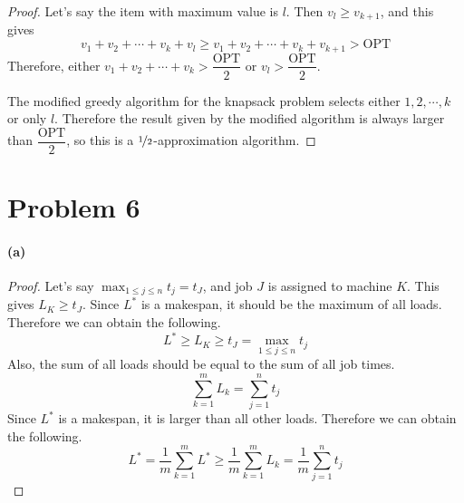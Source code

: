 \documentclass[10pt]{article}
\begin{document}
\begin{proof}
    \vspace{0.3cm} Let's say the item with maximum value is $l$. Then $v_l \geq v_{k+1}$, and this gives
    $$v_1 + v_2 + \cdots + v_k + v_l \geq v_1 + v_2 + \cdots + v_k + v_{k+1} > \textrm{OPT}$$
    Therefore, either $v_1 + v_2 + \cdots + v_k > \dfrac{\textrm{OPT}}{2}$ or $v_l > \dfrac{\textrm{OPT}}{2}$. 
    
    \vspace{0.3cm} The modified greedy algorithm for the knapsack problem selects either $1, 2, \cdots , k$ or only $l$. 
    Therefore the result given by the modified algorithm is always larger than $\dfrac{\textrm{OPT}}{2}$, so this is a $\nicefrac{1}{2}$-approximation algorithm.


\end{proof}

\section*{Problem 6}
\paragraph{(a)} 
\begin{proof}
    Let's say $\max_{1\le j\le n}t_j = t_J$, and job $J$ is assigned to machine $K$.
    This gives $L_K \geq t_J$.
    Since $L^*$ is a makespan, it should be the maximum of all loads. Therefore we can obtain the following.
    $$L^* \geq L_K \geq t_J = \max_{1\le j\le n}t_j$$
    Also, the sum of all loads should be equal to the sum of all job times. 
    $$\sum_{k=1}^{m}L_k = \sum_{j=1}^{n}t_j$$
    Since $L^*$ is a makespan, it is larger than all other loads. Therefore we can obtain the following.
    $$L^* = \frac{1}{m}\sum_{k=1}^{m}L^* \geq \frac{1}{m}\sum_{k=1}^{m}L_k = \frac{1}{m}\sum_{j=1}^{n}t_j$$

\end{proof}
\end{document}

